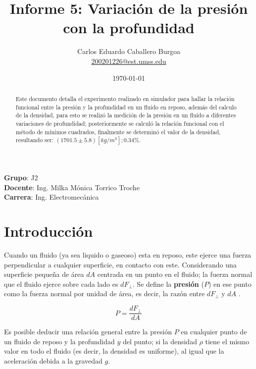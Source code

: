 \documentclass[letter,11pt]{article}
\title{Informe 5: Variación de la presión \\
con la profundidad}
\author{Carlos Eduardo Caballero Burgoa \\
    \small{\href{mailto:200201226@est.umss.edu}{200201226@est.umss.edu}}
}
\date{\today}
\begin{document}
\maketitle
\begin{center}
    \textbf{Grupo}: J2\\
    \textbf{Docente}: Ing. Milka Mónica Torrico Troche\\
    \textbf{Carrera}: Ing. Electromecánica
\end{center}

\begin{abstract}
Este documento detalla el experimento realizado en simulador para hallar la
relación funcional entre la presión y la profundidad en un fluido en reposo,
además del calculo de la densidad, para esto se realizó la medición de la
presión en un fluido a diferentes variaciones de profundidad; posteriormente se
calculó la relación funcional con el método de mínimos cuadrados, finalmente se
determinó el valor de la densidad, resultando ser:
$(1701.5 \pm 5.8)[kg/m^3]; 0.34\%$.
\end{abstract}

\section{Introducción}

Cuando un fluido (ya sea liquido o gaseoso) esta en reposo, este ejerce una
fuerza perpendicular a cualquier superficie, en contacto con este. Considerando
una superficie pequeña de área $dA$ centrada en un punto en el fluido; la
fuerza normal que el fluido ejerce sobre cada lado es $dF_{\perp}$. Se define
la \textbf{presión} ($P$) en ese punto como la fuerza normal por unidad de
área, es decir, la razón entre $dF_{\perp}$ y $dA$ \cite{Young&Freedman}.

\begin{equation}
    P = \frac{dF_{\perp}}{dA}
\label{presion}
\end{equation}
\vspace{0.10cm}

Es posible deducir una relación general entre la presión $P$ en cualquier
punto de un fluido de reposo y la profundidad $y$ del punto; si la densidad
$\rho$ tiene el mismo valor en todo el fluido (es decir, la densidad es
uniforme), al igual que la aceleración debida a la gravedad $g$.
\end{document}
